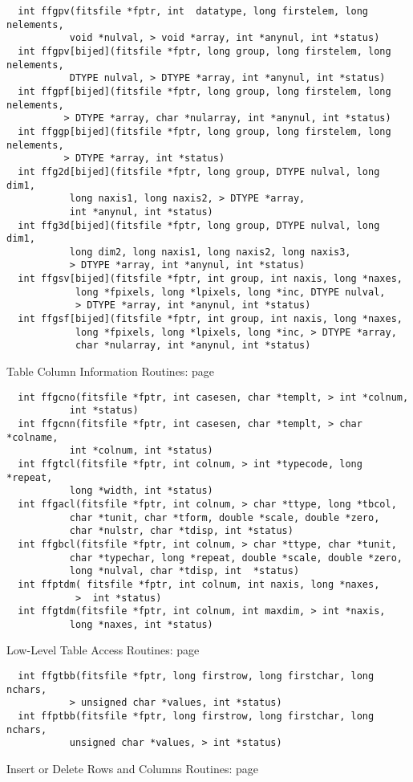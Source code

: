 \begin{verbatim}
  int ffgpv(fitsfile *fptr, int  datatype, long firstelem, long nelements,
           void *nulval, > void *array, int *anynul, int *status)
  int ffgpv[bijed](fitsfile *fptr, long group, long firstelem, long nelements,
           DTYPE nulval, > DTYPE *array, int *anynul, int *status)
  int ffgpf[bijed](fitsfile *fptr, long group, long firstelem, long nelements,
          > DTYPE *array, char *nularray, int *anynul, int *status)
  int ffggp[bijed](fitsfile *fptr, long group, long firstelem, long nelements,
          > DTYPE *array, int *status)
  int ffg2d[bijed](fitsfile *fptr, long group, DTYPE nulval, long dim1,
           long naxis1, long naxis2, > DTYPE *array,
           int *anynul, int *status)
  int ffg3d[bijed](fitsfile *fptr, long group, DTYPE nulval, long dim1,
           long dim2, long naxis1, long naxis2, long naxis3,
           > DTYPE *array, int *anynul, int *status)
  int ffgsv[bijed](fitsfile *fptr, int group, int naxis, long *naxes,
            long *fpixels, long *lpixels, long *inc, DTYPE nulval,
            > DTYPE *array, int *anynul, int *status)
  int ffgsf[bijed](fitsfile *fptr, int group, int naxis, long *naxes,
            long *fpixels, long *lpixels, long *inc, > DTYPE *array,
            char *nularray, int *anynul, int *status)
\end{verbatim}
 Table Column Information Routines: page~\pageref{FFGCNO}

\begin{verbatim}
  int ffgcno(fitsfile *fptr, int casesen, char *templt, > int *colnum,
           int *status)
  int ffgcnn(fitsfile *fptr, int casesen, char *templt, > char *colname,
           int *colnum, int *status)
  int ffgtcl(fitsfile *fptr, int colnum, > int *typecode, long *repeat,
           long *width, int *status)
  int ffgacl(fitsfile *fptr, int colnum, > char *ttype, long *tbcol,
           char *tunit, char *tform, double *scale, double *zero,
           char *nulstr, char *tdisp, int *status)
  int ffgbcl(fitsfile *fptr, int colnum, > char *ttype, char *tunit,
           char *typechar, long *repeat, double *scale, double *zero,
           long *nulval, char *tdisp, int  *status)
  int ffptdm( fitsfile *fptr, int colnum, int naxis, long *naxes,
            >  int *status)
  int ffgtdm(fitsfile *fptr, int colnum, int maxdim, > int *naxis,
           long *naxes, int *status)
\end{verbatim}
 Low-Level Table Access Routines: page~\pageref{FFGTBB}

\begin{verbatim}
  int ffgtbb(fitsfile *fptr, long firstrow, long firstchar, long nchars,
           > unsigned char *values, int *status)
  int ffptbb(fitsfile *fptr, long firstrow, long firstchar, long nchars,
           unsigned char *values, > int *status)
\end{verbatim}
 Insert or Delete Rows and Columns Routines: page~\pageref{FFIROW}

